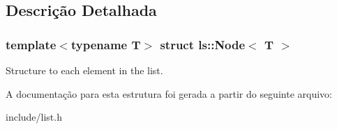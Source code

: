\subsection{Descrição Detalhada}
\subsubsection*{template$<$typename T$>$\newline
struct ls\+::\+Node$<$ T $>$}

Structure to each element in the list. 

A documentação para esta estrutura foi gerada a partir do seguinte arquivo\+:\begin{DoxyCompactItemize}
\item 
include/list.\+h\end{DoxyCompactItemize}
